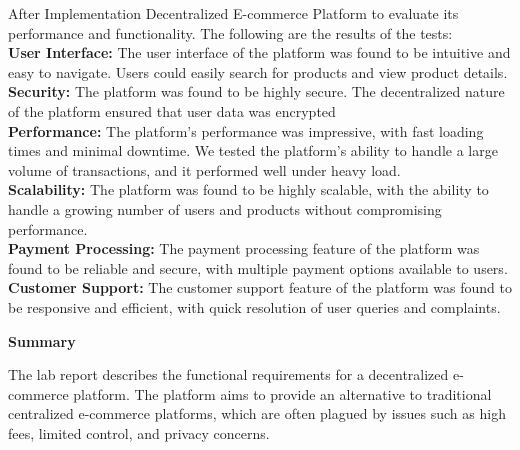 \documentclass[a4paper,11pt]{article}
\begin{document}
\begin{center}
\begin{center}
  After Implementation  Decentralized E-commerce Platform to evaluate its performance and functionality. The following are the results of the tests: \\
 \textbf{ User Interface:} The user interface of the platform was found to be intuitive and easy to navigate. Users could easily search for products and view product details. \\
 \textbf{Security:} The platform was found to be highly secure. The decentralized nature of the platform ensured that user data was encrypted \\
 \textbf{Performance: }The platform's performance was impressive, with fast loading times and minimal downtime. We tested the platform's ability to handle a large volume of transactions, and it performed well under heavy load.\\
\textbf{Scalability:} The platform was found to be highly scalable, with the ability to handle a growing number of users and products without compromising performance. \\
\textbf{Payment Processing: }The payment processing feature of the platform was found to be reliable and secure, with multiple payment options available to users.\\
\textbf{Customer Support:} The customer support feature of the platform was found to be responsive and efficient, with quick resolution of user queries and complaints.
    
\end{center}

\vspace{1cm}

\begin{center}
    \textbf{\Large Summary }
    \vspace{1cm}



    
The lab report describes the functional requirements for a decentralized e-commerce platform. The platform aims to provide an alternative to traditional centralized e-commerce platforms, which are often plagued by issues such as high fees, limited control, and privacy concerns.
\vspace{0.5cm}


\end{center}
\end{center}
\end{document}

